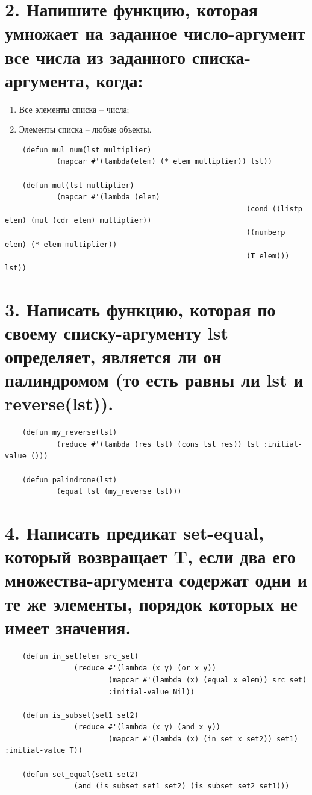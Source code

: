 \documentclass[12pt]{report}
\begin{document}
\section*{2. Напишите функцию, которая умножает на заданное число-аргумент все числа из заданного списка-аргумента, когда:}

\begin{enumerate}
	\item Все элементы списка -- числа;
	\item Элементы списка -- любые объекты.
\end{enumerate}

\begin{lstlisting}
	(defun mul_num(lst multiplier)
			(mapcar #'(lambda(elem) (* elem multiplier)) lst))
	
	(defun mul(lst multiplier)
			(mapcar #'(lambda (elem)
														(cond ((listp elem) (mul (cdr elem) multiplier))
														((numberp elem) (* elem multiplier))
														(T elem))) lst))
\end{lstlisting}

\section*{3. Написать функцию, которая по своему списку-аргументу lst определяет, является ли он палиндромом (то есть равны ли lst и reverse(lst)).}

\begin{lstlisting}
	(defun my_reverse(lst)
			(reduce #'(lambda (res lst) (cons lst res)) lst :initial-value ()))
	
	(defun palindrome(lst)
			(equal lst (my_reverse lst)))
\end{lstlisting}

\clearpage
\section*{4. Написать предикат set-equal, который возвращает T, если два его множества-аргумента содержат одни и те же элементы, порядок которых не имеет значения.}

\begin{lstlisting}
	(defun in_set(elem src_set) 
				(reduce #'(lambda (x y) (or x y)) 
						(mapcar #'(lambda (x) (equal x elem)) src_set) 
						:initial-value Nil))
	
	(defun is_subset(set1 set2)
				(reduce #'(lambda (x y) (and x y)) 
						(mapcar #'(lambda (x) (in_set x set2)) set1) :initial-value T))
	
	(defun set_equal(set1 set2)
				(and (is_subset set1 set2) (is_subset set2 set1)))
\end{lstlisting}
\end{document}

